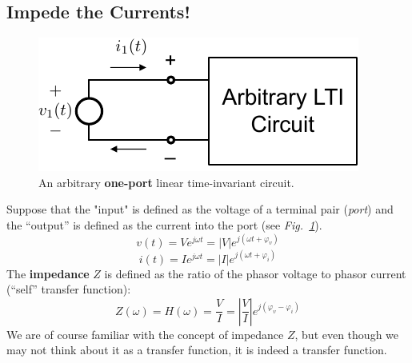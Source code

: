 \subsection{Impede the Currents!}
\begin{figure}[tb]
\centering
\includegraphics[width=.65\columnwidth]{mod1_3_2_oneport}
\caption{An arbitrary \textbf{one-port} linear time-invariant circuit.}
\label{fig:oneport}
\end{figure}
Suppose that the "input" is defined as the voltage of a terminal pair (\textit{port}) and the “output” is defined as the current into the port (see \emph{Fig.~\ref{fig:oneport}}).  
    \begin{equation}
        v(t) = V{e^{j\omega t}} = \left| V \right|{e^{j(\omega t + {\varphi _v})}}
    \end{equation}
    \begin{equation}
        i(t) = I{e^{j\omega t}} = \left| I \right|{e^{j(\omega t + {\varphi _i})}}
    \end{equation}
The \textbf{impedance} $Z$ is defined as the ratio of the phasor voltage to phasor current (“self” transfer function):
    \begin{equation}
        Z(\omega ) = H(\omega ) = \frac{V}{I} = \left| {\frac{V}{I}} \right|{e^{j({\varphi _v} - {\varphi _i})}}
    \end{equation}
We are of course familiar with the concept of impedance $Z$, but even though we may not think about it as a transfer function, it is indeed a transfer function.
